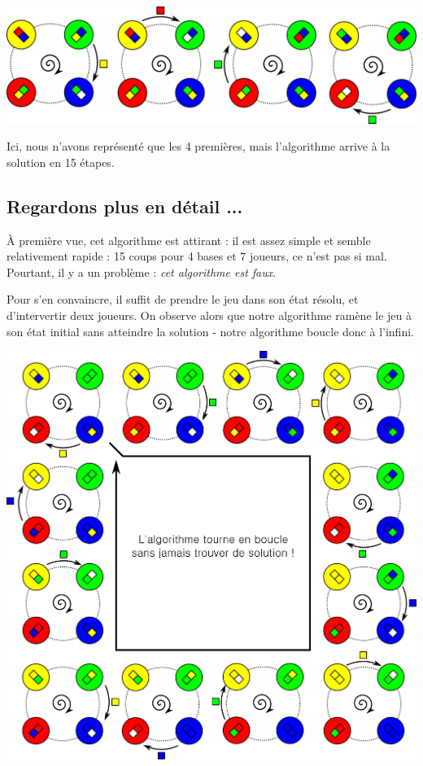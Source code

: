 \documentclass[a5paper,pagesize,DIV=14]{scrbook}
\begin{document}
\begin{center}
  \includegraphics[width=\linewidth]{img/baseball_ex1.pdf}
\end{center}

Ici, nous n'avons représenté que les 4 premières, mais l'algorithme arrive à la solution en 15 étapes.

\subsection*{Regardons plus en détail ...}

À première vue, cet algorithme est attirant : il est assez simple et semble relativement rapide : 15 coups pour 4 bases et 7 joueurs, ce n'est pas si mal. Pourtant, il y a un problème : \textit{cet algorithme est faux}. 

Pour s'en convaincre, il suffit de prendre le jeu dans son état résolu, et d'intervertir deux joueurs. On observe alors que notre algorithme ramène le jeu à son état initial sans atteindre la solution - notre algorithme boucle donc à l'infini.

\begin{center}
  \includegraphics[width=\linewidth]{img/baseball_ex2.pdf}
\end{center}
\end{document}
